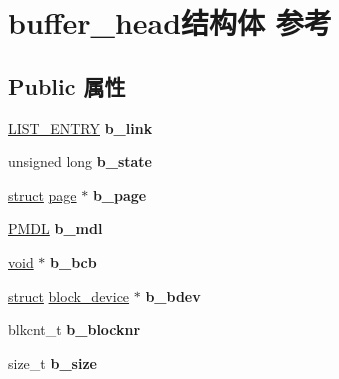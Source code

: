 \hypertarget{structbuffer__head}{}\section{buffer\+\_\+head结构体 参考}
\label{structbuffer__head}
\subsection*{Public 属性}
\begin{DoxyCompactItemize}
\item 
\mbox{\label{structbuffer__head_a3701ec247296dd8066735f912be5d32c}} 
\hyperlink{struct___l_i_s_t___e_n_t_r_y}{L\+I\+S\+T\+\_\+\+E\+N\+T\+RY} {\bfseries b\+\_\+link}
\item 
\mbox{\label{structbuffer__head_a53c20e8b68452f6d838bfcd886482437}} 
unsigned long {\bfseries b\+\_\+state}
\item 
\mbox{\label{structbuffer__head_ad195c28d3cb6e1ed293c0ce368fda1fd}} 
\hyperlink{interfacestruct}{struct} \hyperlink{structpage}{page} $\ast$ {\bfseries b\+\_\+page}
\item 
\mbox{\label{structbuffer__head_ad839fa1695cc1e6ec588cfe3c59a5d12}} 
\hyperlink{interfacevoid}{P\+M\+DL} {\bfseries b\+\_\+mdl}
\item 
\mbox{\label{structbuffer__head_a9eb6d46eafc2f75ff05eaf3c37684963}} 
\hyperlink{interfacevoid}{void} $\ast$ {\bfseries b\+\_\+bcb}
\item 
\mbox{\label{structbuffer__head_a1ebd9e38342ccdcbbc28d3704e7edf01}} 
\hyperlink{interfacestruct}{struct} \hyperlink{structblock__device}{block\+\_\+device} $\ast$ {\bfseries b\+\_\+bdev}
\item 
\mbox{\label{structbuffer__head_a4c6db47e697317d16eef3ccd9b847832}} 
blkcnt\+\_\+t {\bfseries b\+\_\+blocknr}
\item 
\mbox{\label{structbuffer__head_a32db5d2f4834fae045b5eaedb056e4dc}} 
size\+\_\+t {\bfseries b\+\_\+size}
\item 

\end{DoxyCompactItemize}
